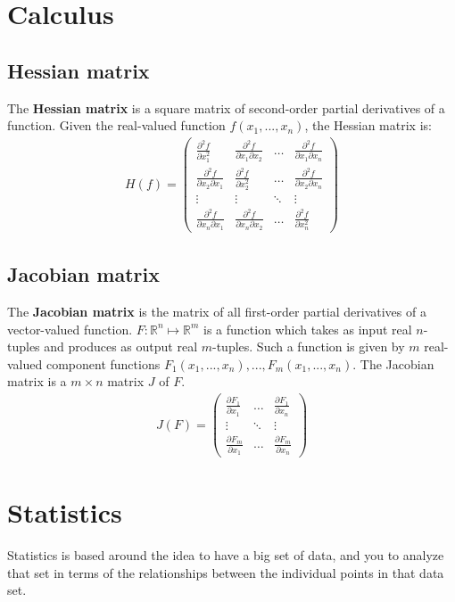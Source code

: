 \documentclass{report}
\begin{document}
\section{Calculus}

\subsection{Hessian matrix}
The {\bf Hessian matrix} is a square matrix of second-order partial derivatives of a function.
Given the real-valued function $f(x_1,...,x_n)$, the Hessian matrix is:
\begin{align*}
H(f) = \begin{pmatrix}
\frac{\partial^2 f}{\partial x_1^2} & \frac{\partial^2 f}{\partial x_1 \partial x_2}  & \dots & \frac{\partial^2 f}{\partial x_1 \partial x_n} \\
\frac{\partial^2 f}{\partial x_2 \partial x_1} & \frac{\partial^2 f}{\partial x_2^2}  & \dots & \frac{\partial^2 f}{\partial x_2 \partial x_n} \\
\vdots & \vdots & \ddots & \vdots \\
\frac{\partial^2 f}{\partial x_n \partial x_1} & \frac{\partial^2 f}{\partial x_n \partial x_2}  & \dots & \frac{\partial^2 f}{\partial x_n^2}
\end{pmatrix}
\end{align*}

\subsection{Jacobian matrix}
The {\bf Jacobian matrix} is the matrix of all first-order partial derivatives of a vector-valued function.
$F : \mathbb{R}^n \mapsto \mathbb{R}^m$ is a function which takes as input real $n$-tuples and produces as output real $m$-tuples.
Such a function is given by $m$ real-valued component functions $F_1(x_1,...,x_n),...,F_m(x_1,...,x_n)$.
The Jacobian matrix is a $m\times n$ matrix $J$ of $F$.
\begin{align*}
J(F) = \begin{pmatrix}
\frac{\partial F_1}{\partial x_1} & \dots & \frac{\partial F_1}{\partial x_n} \\
\vdots & \ddots & \vdots \\
\frac{\partial F_m}{\partial x_1} & \dots & \frac{\partial F_m}{\partial x_n}
\end{pmatrix}
\end{align*}



\section{Statistics}
Statistics is based around the idea to have a big set of data, and you to analyze that set in terms of the relationships between the individual points in that data set.
\end{document}
